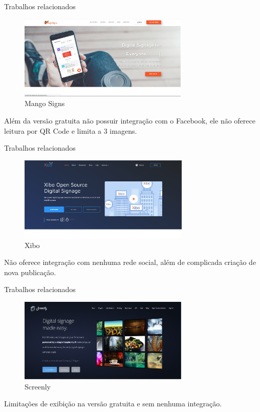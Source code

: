\documentclass{aula-ifb}
\begin{document}
\begin{frame}{Trabalhos relacionados}
	\begin{figure}[h]
    	\includegraphics[height=4cm]{figuras/mango.png}
    	\caption{Mango Signs}
	\end{figure}
	\begin{center}
	Além da versão gratuita não possuir integração com o Facebook, ele não oferece leitura por QR Code e limita a 3 imagens.
	\end{center}
\end{frame}

\begin{frame}{Trabalhos relacionados}
	\begin{figure}[h]
    	\includegraphics[height=4cm]{figuras/xibo.png}
    	\caption{Xibo}
	\end{figure}
	\begin{center}
	Não oferece integração com nenhuma rede social, além de complicada criação de nova publicação.
	\end{center}
\end{frame}

\begin{frame}{Trabalhos relacionados}
	\begin{figure}[h]
    	\includegraphics[height=4cm]{figuras/screenly.png}
    	\caption{Screenly}
	\end{figure}
	\begin{center}
	Limitações de exibição na versão gratuita e sem nenhuma integração.
	\end{center}
\end{frame}
\end{document}
